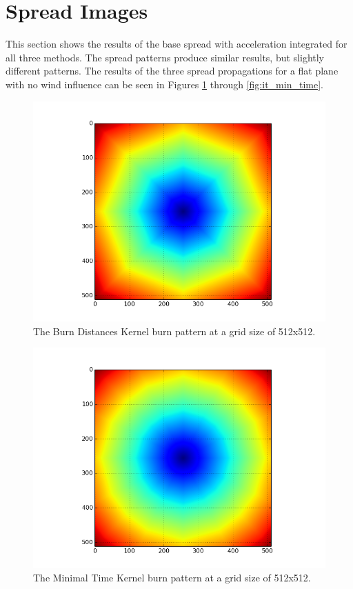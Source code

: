 \section{Spread Images}\label{spread_ims}
This section shows the results of the base spread with acceleration integrated for all three methods. The spread patterns produce similar results, but slightly different patterns. The results of the three spread propagations for a flat plane with no wind influence can be seen in Figures \ref{fig:burn_dist} through \ref{fig:it_min_time}.
\begin{figure}%
\centering
  \includegraphics[height=0.27\textheight]{figures/results/burn_dist.png}
  \caption{The Burn Distances Kernel burn pattern at a grid size of 512x512.}
  \label{fig:burn_dist}
\end{figure}
\begin{figure}%
\centering
  \includegraphics[height=0.27\textheight]{figures/results/min_time.png}
  \caption{The Minimal Time Kernel burn pattern at a grid size of 512x512.}
  \label{fig:min_time}
\end{figure}
